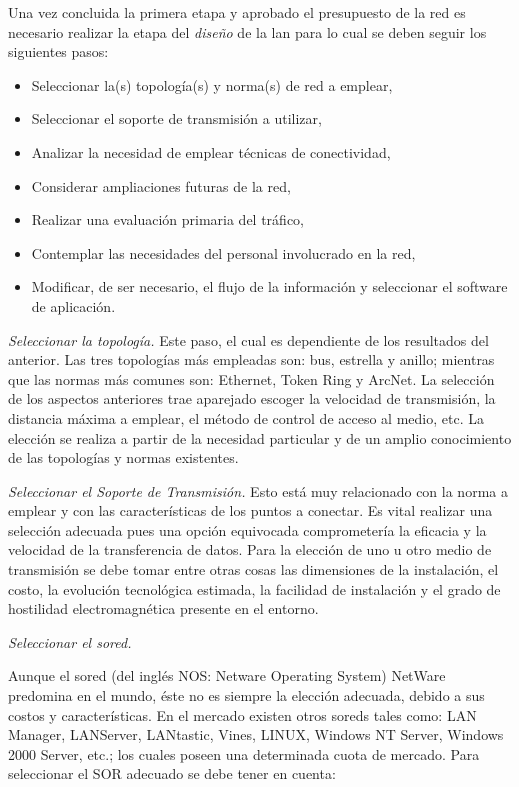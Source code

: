 Una vez concluida la primera etapa y aprobado el presupuesto de la red es necesario realizar la etapa del \textit{diseño} de la \gls{lan} para lo cual se deben seguir los siguientes pasos:

\renewcommand{\labelitemi}{$-$}

\begin{itemize}
\item Seleccionar la(s) topología(s) y norma(s) de red a emplear,
\item Seleccionar el soporte de transmisión a utilizar,
\item Analizar la necesidad de emplear técnicas de conectividad,
\item Considerar ampliaciones futuras de la red,
\item Realizar una evaluación primaria del tráfico,
\item Contemplar las necesidades del personal involucrado en la red,
\item Modificar, de ser necesario, el flujo de la información y seleccionar el software de aplicación.
\end{itemize}

\textit{Seleccionar la topología.} Este paso, el cual es dependiente de los resultados del anterior. Las tres topologías más empleadas son: bus, estrella y anillo; mientras que las normas más comunes son: Ethernet, Token Ring y ArcNet. La selección de los aspectos anteriores trae aparejado escoger la velocidad de transmisión, la distancia máxima a emplear, el método de control de acceso al medio, etc. La elección se realiza a partir de la necesidad particular y de un amplio conocimiento de las topologías y normas existentes. 

\textit{Seleccionar el Soporte de Transmisión.} Esto está muy relacionado con la norma a emplear y con las características de los puntos a conectar. Es vital realizar una selección adecuada pues una opción equivocada comprometería la eficacia y la velocidad de la transferencia de datos. Para la elección de uno u otro medio de transmisión se debe tomar entre otras cosas las dimensiones de la instalación, el costo, la evolución tecnológica estimada, la facilidad de instalación y el grado de hostilidad electromagnética presente en el entorno. 


\textit{Seleccionar el \gls{sored}.}

Aunque el \gls{sored}  (del inglés NOS: Netware Operating System) NetWare predomina en el mundo, éste no es siempre la elección adecuada, debido a sus costos y características. En el mercado existen otros \glspl{sored} tales como: LAN Manager, LANServer, LANtastic, Vines, LINUX, Windows NT Server, Windows 2000 Server, etc.; los cuales poseen una determinada cuota de mercado. Para seleccionar el SOR adecuado se debe tener en cuenta:

